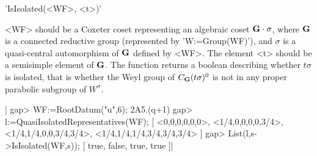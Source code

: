 'IsIsolated(<WF>, <t>)'

<WF>   should  be   a  Coxeter   coset  representing   an  algebraic  coset
${\bf G}\cdot\sigma$,  where ${\bf G}$ is a  connected reductive group (represented
by  'W:=Group(WF)'), and $\sigma$ is  a quasi-central automorphism of ${\bf G}$
defined  by <WF>. The element <t> should  be a semisimple element of ${\bf G}$.
The  function returns a  boolean describing whether  $t\sigma$ is isolated,
that  is whether the Weyl group of  $C_{\bf G}(t\sigma)^0$ is not in any proper
parabolic subgroup of $W^\sigma$.

|    gap> WF:=RootDatum("u",6);
    2A5.(q+1)
    gap> l:=QuasiIsolatedRepresentatives(WF);
    [ <0,0,0,0,0,0>, <1/4,0,0,0,0,3/4>, <1/4,1/4,0,0,3/4,3/4>, 
      <1/4,1/4,1/4,3/4,3/4,3/4> ]
    gap> List(l,s->IsIsolated(WF,s));           
    [ true, false, true, true ]|

